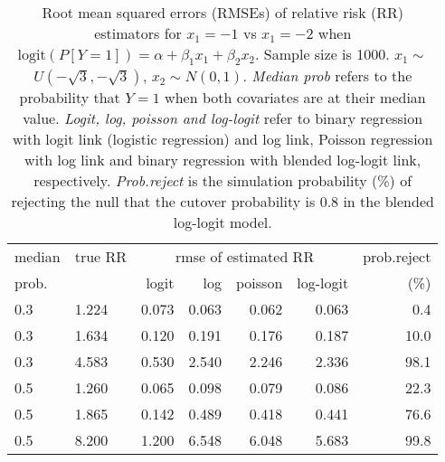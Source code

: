 \documentclass[12pt,a4paper]{article}
\begin{document}
\begin{table}[H] 
\small\sf\centering 
\caption{Root mean squared errors (RMSEs) of relative risk (RR) estimators for $x_1=-1$ vs $x_1=-2$ when $\mbox{logit}(P[Y=1])=\alpha+\beta_1 x_1 + \beta_2 x_2$. Sample size is 1000. $x_1 \sim $$U(-\sqrt{3},-\sqrt{3})$, $x_2 \sim N(0,1)$. {\it Median prob} refers to the probability that $Y=1$ when both covariates are at their median value. {\it Logit, log, poisson and log-logit} refer to binary regression with logit link (logistic regression) and log link, Poisson regression with log link and binary regression with blended log-logit link, respectively. {\it Prob.reject} is the simulation probability (\%) of rejecting the null that the cutover probability is $0.8$ in the blended log-logit model.} 
\begin{tabular}{llrrrrr} 
\toprule 
median & true RR & \multicolumn{4}{c}{rmse of estimated RR} & prob.reject \\ 
prob. & & logit & log & poisson & log-logit  & (\%) \\ \midrule 
0.3 & 1.224 & 0.073 & 0.063 & 0.062 & 0.063 &  0.4 \\  
0.3 & 1.634 & 0.120 & 0.191 & 0.176 & 0.187 & 10.0 \\  
0.3 & 4.583 & 0.530 & 2.540 & 2.246 & 2.336 & 98.1 \\  
0.5 & 1.260 & 0.065 & 0.098 & 0.079 & 0.086 & 22.3 \\  
0.5 & 1.865 & 0.142 & 0.489 & 0.418 & 0.441 & 76.6 \\  
0.5 & 8.200 & 1.200 & 6.548 & 6.048 & 5.683 & 99.8 \\  
\bottomrule 
\end{tabular} 
\end{table} 
\end{document}
